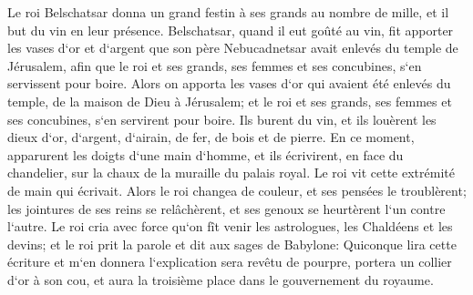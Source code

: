 \verse Le roi Belschatsar donna un grand festin à ses grands au nombre de mille, et il but du vin en leur présence. 
\verse Belschatsar, quand il eut goûté au vin, fit apporter les vases d`or et d`argent que son père Nebucadnetsar avait enlevés du temple de Jérusalem, afin que le roi et ses grands, ses femmes et ses concubines, s`en servissent pour boire. 
\verse Alors on apporta les vases d`or qui avaient été enlevés du temple, de la maison de Dieu à Jérusalem; et le roi et ses grands, ses femmes et ses concubines, s`en servirent pour boire. 
\verse Ils burent du vin, et ils louèrent les dieux d`or, d`argent, d`airain, de fer, de bois et de pierre. 
\verse En ce moment, apparurent les doigts d`une main d`homme, et ils écrivirent, en face du chandelier, sur la chaux de la muraille du palais royal. Le roi vit cette extrémité de main qui écrivait. 
\verse Alors le roi changea de couleur, et ses pensées le troublèrent; les jointures de ses reins se relâchèrent, et ses genoux se heurtèrent l`un contre l`autre. 
\verse Le roi cria avec force qu`on fît venir les astrologues, les Chaldéens et les devins; et le roi prit la parole et dit aux sages de Babylone: Quiconque lira cette écriture et m`en donnera l`explication sera revêtu de pourpre, portera un collier d`or à son cou, et aura la troisième place dans le gouvernement du royaume. 
